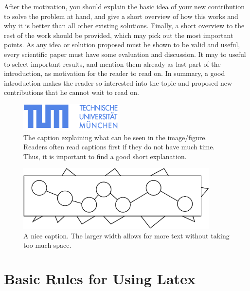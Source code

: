 \documentclass[A4,twocolumn]{article}
\begin{document}
After the motivation, you should explain the basic idea of your new
contribution to solve the problem at hand, and give a short overview
of how this works and why it is better than all other existing solutions.
Finally, a short overview to the rest of the work should be provided,
which may pick out the most important points. As any idea or solution
proposed must be shown to be valid and useful, every scientific paper
must have some evaluation and discussion. It may to useful to select
important results, and mention them already as last part of the
introduction, as motivation for the reader to read on. In summary,
a good introduction makes the reader so interested into the topic and
proposed new contributions that he cannot wait to read on.

\begin{figure}
\centerline{
\includegraphics[width=0.9\columnwidth]{TUM-Logo-102.png}
}
\caption{The caption explaining what can be seen in the image/figure.
Readers often read captions first if they do not have much time. Thus,
it is important to find a good short explanation.}
\label{TUM}
\end{figure}

\begin{figure}[t]
\centerline{
\includegraphics[width=0.9\textwidth]{test.pdf}
}
\caption{A nice caption. The larger width allows for more text without
taking too much space.}
\label{Fig2}
\end{figure}


\section{Basic Rules for Using Latex}
\end{document}
